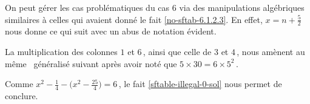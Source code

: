 \begin{remark}
	On peut gérer les cas problématiques du cas $6$ via des manipulations algébriques similaires à celles qui avaient donné le fait \ref{no-sftab-6.1.2.3}.
	En effet, $x = n + \frac52$ nous donne ce qui suit avec un abus de notation évident.
	\begin{center}
	\end{center}
	
	La multiplication des colonnes $1$ et $6$\,, ainsi que celle de $3$ et $4$\,, nous amènent au même \sftab\ généralisé suivant après avoir noté que $5 \times 30 = 6 \times 5^2$\,.
	\begin{center}
	\end{center}
	
	
	Comme $x^2 - \frac14 - \big( x^2 - \frac{25}{4} \big) = 6$\,, le fait \ref{sftable-illegal-0-sol} nous permet de conclure.
\end{remark}

